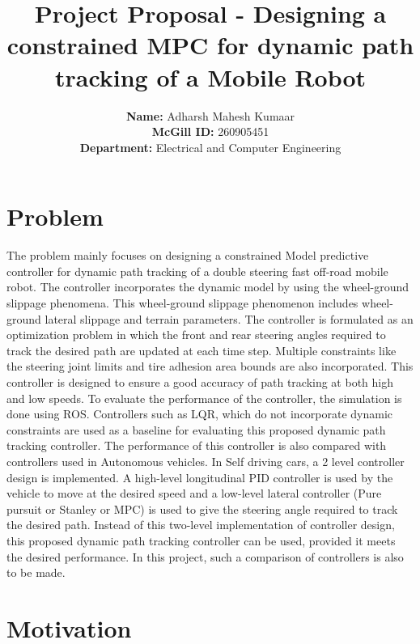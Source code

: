 \documentclass{IEEEtran}
\begin{document}
\title{Project Proposal - Designing a constrained MPC for dynamic path tracking of a Mobile Robot}
\author{\textbf{Name:} Adharsh Mahesh Kumaar\\ \textbf{McGill ID:} 260905451 \\\textbf{Department:} Electrical and Computer Engineering}
\maketitle

\section{Problem}
\label{sec:Problem}
The problem mainly focuses on designing a constrained Model predictive controller for dynamic path tracking of a double steering fast off-road mobile robot. The controller incorporates the dynamic model by using the wheel-ground slippage phenomena. This wheel-ground slippage phenomenon includes wheel-ground lateral slippage and terrain parameters. The controller is formulated as an optimization problem in which the front and rear steering angles required to track the desired path are updated at each time step. Multiple constraints like the steering joint limits and tire adhesion area bounds are also incorporated. This controller is designed to ensure a good accuracy of path tracking at both high and low speeds. To evaluate the performance of the controller, the simulation is done using ROS. Controllers such as LQR, which do not incorporate dynamic constraints are used as a baseline for evaluating this proposed dynamic path tracking controller. The performance of this controller is also compared with controllers used in Autonomous vehicles. In Self driving cars, a 2 level controller design is implemented. A high-level longitudinal PID controller is used by the vehicle to move at the desired speed and a low-level lateral controller (Pure pursuit or Stanley or MPC) is used to give the steering angle required to track the desired path. Instead of this two-level implementation of controller design, this proposed dynamic path tracking controller can be used, provided it meets the desired performance. In this project, such a comparison of controllers is also to be made.

\section{Motivation}
\end{document}
